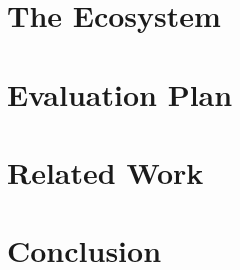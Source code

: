 \documentclass[11pt,a4paper]{article}
\begin{document}
\section{The Ecosystem}
\label{sec:ecosystem}

\section{Evaluation Plan}
\label{sec:eval}

\section{Related Work}
\label{sec:related}

\section{Conclusion}
\label{sec:conclusion}



\end{document}
